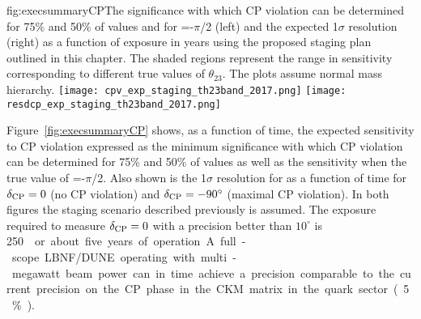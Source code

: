\begin{dunefigure}{fig:execsummaryCP}{The
    significance with which CP violation can be determined for 75\% and 50\% of
    \deltacp values and for \deltacp=-$\pi$/2 (left) and the expected 1$\sigma$ resolution
    (right) as a function of exposure in years using the proposed
    staging plan outlined in this chapter. The shaded regions
    represent the range in sensitivity corresponding to
    different true values of $\theta_{23}$. The plots assume normal mass hierarchy.}
\texttt{[image: cpv\_exp\_staging\_th23band\_2017.png]}
 \texttt{[image: resdcp\_exp\_staging\_th23band\_2017.png]}
\end{dunefigure}
%
Figure~\ref{fig:execsummaryCP} shows, as a function of time, the
expected sensitivity to CP violation expressed as the minimum significance
with which CP violation can be determined for 75\% and 50\% of
\deltacp values as well as the sensitivity when the true value of \deltacp=-$\pi$/2.
Also shown is the 1$\sigma$ resolution for \deltacp as a
function of time for $\delta_{\rm CP}=0$ (no CP violation) and
$\delta_{\rm CP}=-90^\circ$ (maximal CP violation). In both figures the staging scenario
described previously is assumed.  The exposure required to measure
$\delta_{\rm CP} = 0 $ with a precision better than $10^\circ$ is \SI{250}~\ktMWyr{} or about five years of operation. A full-scope LBNF/DUNE operating with 
multi-megawatt 
beam power can in time achieve a precision 
comparable to the current precision on the CP phase in the
CKM matrix in the quark sector (5\%).

